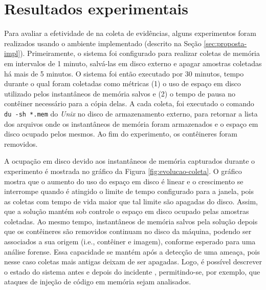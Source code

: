 \section{Resultados experimentais}
\label{sec:proposta-exp}

Para avaliar a efetividade de \fancyname na coleta de evidências, alguns experimentos foram realizados usando o ambiente implementado (descrito na Seção \ref{sec:proposta-impl}).
%
Primeiramente, o sistema foi configurado para realizar coletas de memória em intervalos de 1 minuto, salvá-las em disco externo e apagar amostras coletadas há mais de 5 minutos. 
%
O sistema foi então executado por 30 minutos, tempo durante o qual foram coletadas como métricas (1) o uso de espaço em disco utilizado pelos instantâneos de memória salvos e (2) o tempo de pausa no contêiner necessário para a cópia delas.
%
A cada coleta, foi executado o comando \texttt{du -sh *.mem} do \textit{Unix} no disco de armazenamento externo, para retornar a lista dos arquivos onde os instantâneos de memória foram armazenados e o espaço em disco ocupado pelos mesmos. 
%
Ao fim do experimento, os contêineres foram removidos.


A ocupação em disco devido aos instantâneos de memória capturados durante o experimento é mostrada no gráfico da Figura \ref{fig:evolucao-coleta}. 
%
O gráfico mostra que o aumento do uso do espaço em disco é linear e o crescimento se interrompe quando é atingido o limite de tempo configurado para a janela, pois as coletas com tempo de vida maior que tal limite são apagadas do disco. 
%
Assim, que a solução mantém sob controle o espaço em disco ocupado pelas amostras coletadas.
%
Ao mesmo tempo, instantâneos de memória salvos pela solução depois que os contêineres são removidos continuam no disco da máquina, podendo ser associados a sua origem (i.e., contêiner e imagem), conforme esperado para uma análise forense.
%
Essa capacidade se mantém após a detecção de uma ameaça, pois nesse caso coletas mais antigas deixam de ser apagadas.
%
Logo, é possível descrever o estado do sistema antes e depois do incidente \cite{CaseMemoryForensics:2014}, permitindo-se, por exemplo, que ataques de injeção de código em memória sejam analisados.


